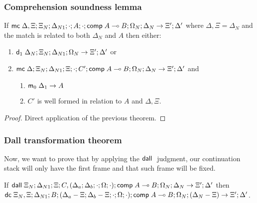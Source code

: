 \subsubsection{Comprehension soundness lemma}

If $\mathsf{mc} \; \Delta, \Xi; \Xi_N; \Delta_{N1}; \cdot; A; \cdot; \mathsf{comp} \; A \multimap B; \Omega_N; \Delta_N \rightarrow \Xi'; \Delta'$ where $\Delta, \Xi = \Delta_N$ and the match is related to both $\Delta_N$ and $A$ then either:\\
\begin{enumerate}
   \item $\mathsf{d}_1 \; \Delta_N; \Xi_N; \Delta_{N1}; \Omega_N \rightarrow \Xi'; \Delta'$ or
   \item $\mathsf{mc} \; \Delta; \Xi_N; \Delta_{N1}; \Xi; \cdot; C'; \mathsf{comp} \; A \multimap B; \Omega_N; \Delta_N \rightarrow \Xi'; \Delta'$ and
      \begin{enumerate}
         \item $\mathsf{m}_0 \; \Delta_1 \rightarrow A$
         \item $C'$ is well formed in relation to $A$ and $\Delta, \Xi$.
      \end{enumerate}
\end{enumerate}

\begin{proof}
Direct application of the previous theorem.
\end{proof}

\subsubsection{Dall transformation theorem}

Now, we want to prove that by applying the $\mathsf{dall} \;$ judgment, our continuation stack will only have the first frame and that such frame will be fixed.

If $\mathsf{dall} \; \Xi_N; \Delta_{N1}; \Xi; C, (\Delta_a; \Delta_b; \cdot; \Omega; \cdot); \mathsf{comp} \; A \multimap B; \Omega_N; \Delta_N \rightarrow \Xi'; \Delta'$ then 
$\mathsf{dc} \; \Xi_N, \Xi; \Delta_{N1}; B; (\Delta_a - \Xi; \Delta_b - \Xi; \cdot; \Omega; \cdot); \mathsf{comp} \; A \multimap B; \Omega_N; (\Delta_N - \Xi) \rightarrow \Xi'; \Delta'$.

